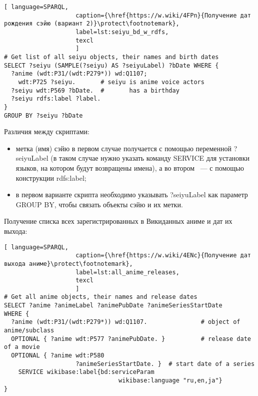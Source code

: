 \begin{lstlisting}[ language=SPARQL, 
                    caption={\href{https://w.wiki/4FPn}{Получение дат рождения сэйю (вариант 2)}\protect\footnotemark},
                    label=lst:seiyu_bd_w_rdfs,
                    texcl 
                    ]
# Get list of all seiyu objects, their names and birth dates
SELECT ?seiyu (SAMPLE(?seiyu) AS ?seiyuLabel) ?bDate WHERE {
  ?anime (wdt:P31/(wdt:P279*)) wd:Q1107;
    wdt:P725 ?seiyu.       # seiyu is anime voice actors
  ?seiyu wdt:P569 ?bDate.  #       has a birthday 
  ?seiyu rdfs:label ?label.
}
GROUP BY ?seiyu ?bDate
\end{lstlisting}%

Различия между скриптами:

\begin{itemize}
    \item метка (имя) сэйю в первом случае получается с помощью переменной ?seiyuLabel (в таком случае нужно указать команду SERVICE для установки языков, на котором будут возвращены имена), а во втором ~--- с помощью конструкции rdfs:label;
    \item в первом варианте скрипта необходимо указывать ?seiyuLabel как параметр GROUP BY, чтобы связать объекты сэйю и их метки.
\end{itemize}

Получение списка всех зарегистрированных в Викиданных аниме и дат их выхода: 

\begin{lstlisting}[ language=SPARQL, 
                    caption={\href{https://w.wiki/4ENc}{Получение дат выхода аниме}\protect\footnotemark},
                    label=lst:all_anime_releases,
                    texcl 
                    ]
# Get all anime objects, their names and release dates
SELECT ?anime ?animeLabel ?animePubDate ?animeSeriesStartDate
WHERE {
  ?anime (wdt:P31/(wdt:P279*)) wd:Q1107.               # object of anime/subclass
  OPTIONAL { ?anime wdt:P577 ?animePubDate. }          # release date of a movie
  OPTIONAL { ?anime wdt:P580
					?animeSeriesStartDate. }  # start date of a series
    SERVICE wikibase:label{bd:serviceParam
					     		wikibase:language "ru,en,ja"}
}
\end{lstlisting}%

